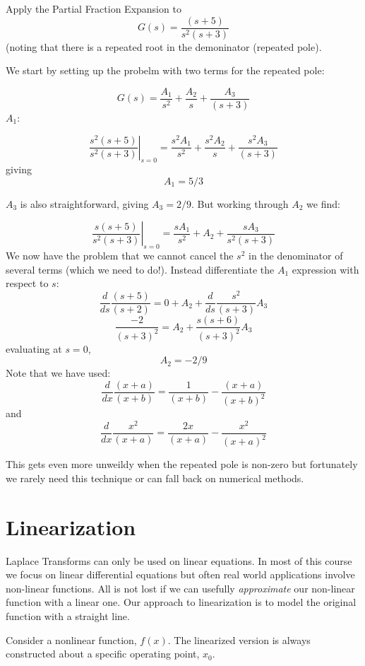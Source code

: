 \begin{ExampleSmall}
Apply the Partial Fraction Expansion to
\[
G(s) = \frac {(s+5)}  {s^2(s+3)}
\]
(noting that there is a repeated root  in the demoninator (repeated pole).

We start by setting up the probelm with two terms for the repeated pole:

\[
G(s) = \frac {A_1}{s^2} +  \frac {A_2}{s} +  \frac {A_3}{(s+3)}
\]
$A_1$:

\[
\left . \frac{s^2(s+5)} {s^2(s+3)}\right |_{s=0}  = \frac {s^2A_1}  {s^2}   + \frac{s^2A_2} {s} + \frac {s^2A_3} {(s+3)}
\]
giving
\[
A_1 = 5/3
\]

$A_3$ is also straightforward, giving $A_3 = 2/9$. But working through $A_2$ we find:

\[
\left . \frac{s(s+5)} {s^2(s+3)}\right |_{s=0}  = \frac {sA_1}  {s^2}   + {A_2}  + \frac {sA_3} {s^2(s+3)}
\]
We now have the problem that we cannot cancel the $s^2$ in the denominator of several terms (which we need to do!).   Instead differentiate the $A_1$ expression with respect to $s$:
\[
\frac{d}{ds}\frac{(s+5)}{(s+2)} = 0 + A_2 + \frac{d}{ds} \frac{s^2}{(s+3)}A_3
\]
\[
\frac{-2}{(s+3)^2} = A_2 + \frac{s(s+6)}{(s+3)^2}A_3
\]
evaluating at $s=0$,
\[
A_2 = -2/9
\]
Note that we have used:
\[
\frac{d}{dx}\frac{(x+a)}{(x+b)} = \frac{1}{(x+b)} - \frac{(x+a)}{(x+b)^2}
\]
and
\[
\frac{d}{dx} \frac{x^2}{(x+a)} = \frac{2x}{(x+a)} - \frac{x^2}{(x+a)^2}
\]

This gets even more unweildy when the repeated pole is non-zero but fortunately we rarely need this technique or can fall back on numerical methods.
\end{ExampleSmall}




\section{Linearization}

Laplace Transforms can only be used on linear equations.  In most of this course we focus on linear differential equations but often real world applications involve non-linear functions.   All is not lost if we can usefully {\it approximate} our non-linear function with a linear one.  Our approach to linearization is to model the original function with a straight line.


Consider a nonlinear function, $f(x)$.  The linearized version is always constructed about a specific operating point, $x_0$.

